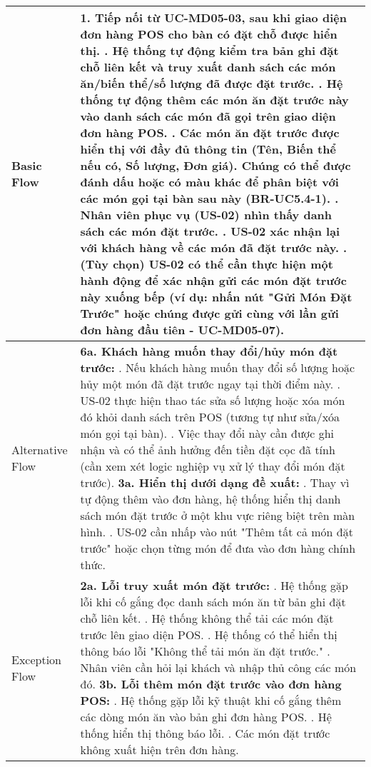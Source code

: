 \begin{longtable}{|m{4cm}|p{11cm}|}
Basic Flow & 1. Tiếp nối từ UC-MD05-03, sau khi giao diện đơn hàng POS cho bàn có đặt chỗ được hiển thị. \newline 2. Hệ thống tự động kiểm tra bản ghi đặt chỗ liên kết và truy xuất danh sách các món ăn/biến thể/số lượng đã được đặt trước. \newline 3. Hệ thống tự động thêm các món ăn đặt trước này vào danh sách các món đã gọi trên giao diện đơn hàng POS. \newline 4. Các món ăn đặt trước được hiển thị với đầy đủ thông tin (Tên, Biến thể nếu có, Số lượng, Đơn giá). Chúng có thể được đánh dấu hoặc có màu khác để phân biệt với các món gọi tại bàn sau này (BR-UC5.4-1). \newline 5. Nhân viên phục vụ (US-02) nhìn thấy danh sách các món đặt trước. \newline 6. US-02 xác nhận lại với khách hàng về các món đã đặt trước này. \newline 7. (Tùy chọn) US-02 có thể cần thực hiện một hành động để xác nhận gửi các món đặt trước này xuống bếp (ví dụ: nhấn nút "Gửi Món Đặt Trước" hoặc chúng được gửi cùng với lần gửi đơn hàng đầu tiên - UC-MD05-07). \\
\hline
Alternative Flow & \textbf{6a. Khách hàng muốn thay đổi/hủy món đặt trước:} \newline    1. Nếu khách hàng muốn thay đổi số lượng hoặc hủy một món đã đặt trước ngay tại thời điểm này. \newline    2. US-02 thực hiện thao tác sửa số lượng hoặc xóa món đó khỏi danh sách trên POS (tương tự như sửa/xóa món gọi tại bàn). \newline    3. Việc thay đổi này cần được ghi nhận và có thể ảnh hưởng đến tiền đặt cọc đã tính (cần xem xét logic nghiệp vụ xử lý thay đổi món đặt trước). \newline \textbf{3a. Hiển thị dưới dạng đề xuất:} \newline    1. Thay vì tự động thêm vào đơn hàng, hệ thống hiển thị danh sách món đặt trước ở một khu vực riêng biệt trên màn hình. \newline    2. US-02 cần nhấp vào nút "Thêm tất cả món đặt trước" hoặc chọn từng món để đưa vào đơn hàng chính thức. \\
\hline
Exception Flow & \textbf{2a. Lỗi truy xuất món đặt trước:} \newline    1. Hệ thống gặp lỗi khi cố gắng đọc danh sách món ăn từ bản ghi đặt chỗ liên kết. \newline    2. Hệ thống không thể tải các món đặt trước lên giao diện POS. \newline    3. Hệ thống có thể hiển thị thông báo lỗi "Không thể tải món ăn đặt trước." \newline    4. Nhân viên cần hỏi lại khách và nhập thủ công các món đó. \newline \textbf{3b. Lỗi thêm món đặt trước vào đơn hàng POS:} \newline    1. Hệ thống gặp lỗi kỹ thuật khi cố gắng thêm các dòng món ăn vào bản ghi đơn hàng POS. \newline    2. Hệ thống hiển thị thông báo lỗi. \newline    3. Các món đặt trước không xuất hiện trên đơn hàng. \\

\end{longtable}
